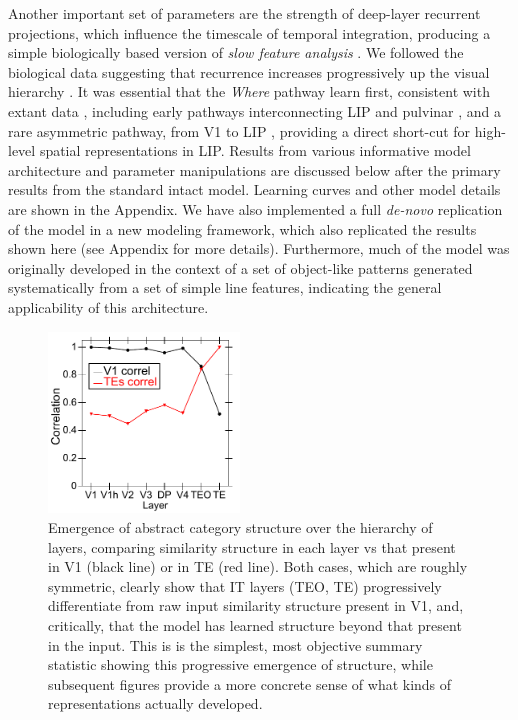 \documentclass[11pt,twoside]{article}
\newif\myifpdf
\begin{document}
Another important set of parameters are the strength of deep-layer recurrent projections, which influence the timescale of temporal integration, producing a simple biologically based version of \emph{slow feature analysis} \citep{WiskottSejnowski02,Foldiak91}. We followed the biological data suggesting that recurrence increases progressively up the visual hierarchy \citep{ChaudhuriKnoblauchGarielEtAl15}.  It was essential that the \emph{Where} pathway learn first, consistent with extant data \citep{BourneRosa06,KiorpesPriceHall-HaroEtAl12}, including early pathways interconnecting LIP and pulvinar \citep{BridgeLeopoldBourne16}, and a rare asymmetric pathway, from V1 to LIP \citep{MarkovErcsey-RavaszGomesEtAl14}, providing a direct short-cut for high-level spatial representations in LIP.  Results from various informative model architecture and parameter manipulations are discussed below after the primary results from the standard intact model.  Learning curves and other model details are shown in the Appendix.  We have also implemented a full \emph{de-novo} replication of the model in a new modeling framework, which also replicated the results shown here (see Appendix for more details).  Furthermore, much of the model was originally developed in the context of a set of object-like patterns generated systematically from a set of simple line features, indicating the general applicability of this architecture.

\begin{figure}
  \centering\includegraphics[width=2in]{fig_deepleabra_wwi_simat_over_lays}
  \caption{\footnotesize Emergence of abstract category structure over the hierarchy of layers, comparing similarity structure in each layer vs that present in V1 (black line) or in TE (red line).  Both cases, which are roughly symmetric, clearly show that IT layers (TEO, TE) progressively differentiate from raw input similarity structure present in V1, and, critically, that the model has learned structure beyond that present in the input.  This is is the simplest, most objective summary statistic showing this progressive emergence of structure, while subsequent figures provide a more concrete sense of what kinds of representations actually developed.}
  \label{fig.simat-lays}
\end{figure}
\end{document}
